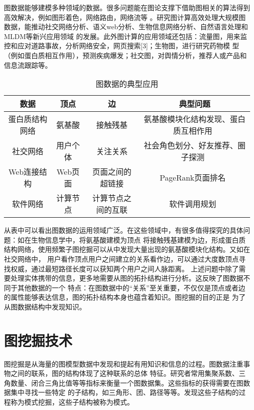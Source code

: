 \documentclass[master]{thesis-uestc}
\begin{document}
    图数据能够建模多种领域的数据。很多问题能在图论支撑下借助图相关的算法得到高效解决，例如图形着色，网络路由，网络流等
。研究图计算高效处理大规模图数据，能推动社交网络分析、语义web分析、生物信息网络分析、自然语言处理和MLDM等新兴应用领域
的发展。此外图计算的应用领域还包括：流量图，用来监控和应对道路事故，分析网络安全，网页搜索[3]；生物图，进行研究药物模
型（例如蛋白质相互作用），预测疾病爆发；社交图，对舆情分析，推荐人或产品和信息流跟踪等。
\begin{table}
    \label{tab:graph-app}
   \caption{图数据的典型应用}
   \begin{tabular}{|c|c|c|c|}
    \hline
    数据 & 顶点 & 边 & 典型问题\\
    \hline
    蛋白质结构网络 & 氨基酸 & 接触残基 & 氨基酸模块化结构发现、蛋白质互相作用~\cite{Spontaneous}\\
    \hline
    社交网络 &用户个体 & 关注关系 & 社会角色划分、好友推荐、圈子探测~\cite{Role} \\
    \hline
    Web连接结构 &Web页面&页面之间的超链接 & PageRank页面排名~\cite{PageRank}\\
    \hline
    软件网络& 计算节点& 计算节点之间的互联 & 软件调用规划~\cite{SoftwareHomology}\\
    \hline
   \end{tabular} 
\end{table}

    从表中可以看出图数据的运用领域广泛。在这些领域中，有很多值得探究的具体问题：如在生物信息学中，将氨基酸建模为顶点
将接触残基建模为边，形成蛋白质结构网络，使用频繁子图挖掘可以从中发现大量出现的氨基酸模块化结构。又如在社交网络中，
用户看作顶点用户之间建立的关系看作边，可以通过大度数顶点寻找权威，通过最短路径长度可以获知两个用户之间人脉距离。
上述问题中除了需要处理实体携带的信息，更多地需要从图的拓扑结构进行分析。这反映了图数据不同于其他数据的一个
特点：在图数据中的“关系”至关重要，不仅仅是顶点或者边的属性能够表达信息，图的拓扑结构本身也蕴含着知识。图挖掘的目的正是
为了从图数据结构中发现知识。

\section{图挖掘技术}
\label{sec:graph-mining}

    图挖掘是从海量的图模型数据中发现和提起有用知识和信息的过程。图数据注重事物之间的联系，图的结构体现了这种联系的总体
特征。研究者常用集聚系数、三角数量、闭合三角比值等等指标来衡量一个图数据集。这些指标的获得需要在图数据集中寻找一些特定
的子结构，如三角形、团、路径等等。发现这些子结构的过程称为模式挖掘，这些子结构被称为模式。
\end{document}
